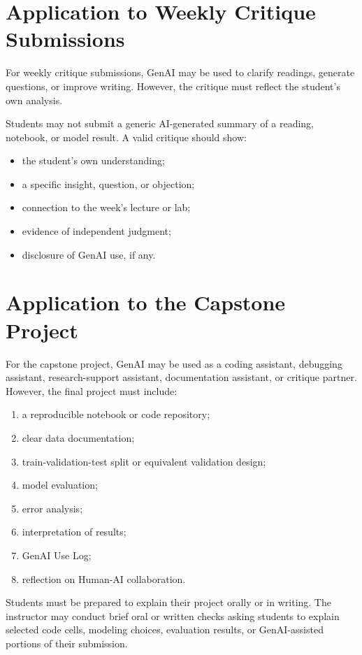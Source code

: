 \documentclass[11pt]{article}
\begin{document}
\section{Application to Weekly Critique Submissions}

For weekly critique submissions, GenAI may be used to clarify readings, generate questions, or improve writing. However, the critique must reflect the student's own analysis.

Students may not submit a generic AI-generated summary of a reading, notebook, or model result. A valid critique should show:

\begin{itemize}
    \item the student's own understanding;
    \item a specific insight, question, or objection;
    \item connection to the week's lecture or lab;
    \item evidence of independent judgment;
    \item disclosure of GenAI use, if any.
\end{itemize}

\section{Application to the Capstone Project}

For the capstone project, GenAI may be used as a coding assistant, debugging assistant, research-support assistant, documentation assistant, or critique partner. However, the final project must include:

\begin{enumerate}
    \item a reproducible notebook or code repository;
    \item clear data documentation;
    \item train-validation-test split or equivalent validation design;
    \item model evaluation;
    \item error analysis;
    \item interpretation of results;
    \item GenAI Use Log;
    \item reflection on Human-AI collaboration.
\end{enumerate}

Students must be prepared to explain their project orally or in writing. The instructor may conduct brief oral or written checks asking students to explain selected code cells, modeling choices, evaluation results, or GenAI-assisted portions of their submission.
\end{document}
